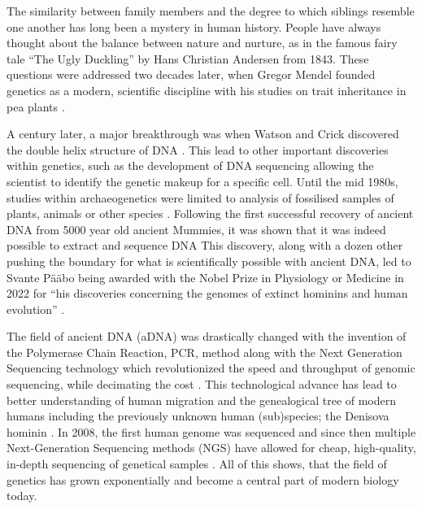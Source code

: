 

The similarity between family members and the degree to which siblings resemble one another has long been a mystery in human history.
People have always thought about the balance between nature and nurture, as in the famous fairy tale ``The Ugly Duckling'' by Hans Christian Andersen from 1843. These questions were addressed two decades later, when Gregor Mendel founded genetics as a modern, scientific discipline with his studies on trait inheritance in pea plants \autocite{mendelgregorVersucheUberPflanzenhybriden1866}.

A century later, a major breakthrough was when Watson and Crick discovered the double helix structure of DNA \autocite{watsonMolecularStructureNucleic1953}. This lead to other important discoveries within genetics, such as the development of DNA sequencing allowing the scientist to identify the genetic makeup for a specific cell. Until the mid 1980s, studies within archaeogenetics were limited to analysis of fossilised samples of plants, animals or other species \autocite{parducciAncientDNAUnlocking2004}. Following the first successful recovery of ancient DNA from 5000 year old ancient Mummies, it was shown that it was indeed possible to extract and sequence DNA \autocite{paaboMolecularCloningAncient1985,paaboPreservationDNAAncient1985}
This discovery, along with a dozen other pushing the boundary for what is scientifically possible with ancient DNA, led to Svante Pääbo being awarded with the Nobel Prize in Physiology or Medicine in 2022 for ``his discoveries concerning the genomes of extinct hominins and human evolution'' \autocite{thenobelassemblyatkarolinskainstitutetNobelPrizePhysiology2022}.

The field of ancient DNA (aDNA) was drastically changed with the invention of the Polymerase Chain Reaction, PCR, method \autocite{mullisSpecificEnzymaticAmplification1986} along with the Next Generation Sequencing technology which revolutionized the speed and throughput of genomic sequencing, while decimating the cost \autocite{slatkoOverviewNextGeneration2018}. This technological advance has lead to better understanding of human migration and the genealogical tree of modern humans including the previously unknown human (sub)species; the Denisova hominin \autocite{krauseCompleteMitochondrialDNA2010}. In 2008, the first human genome was sequenced and since then multiple Next-Generation Sequencing methods (NGS) have allowed for cheap, high-quality, in-depth sequencing of genetical samples \autocite{genomicsBriefHistoryNext2021}. All of this shows, that the field of genetics has grown exponentially and become a central part of modern biology today.

